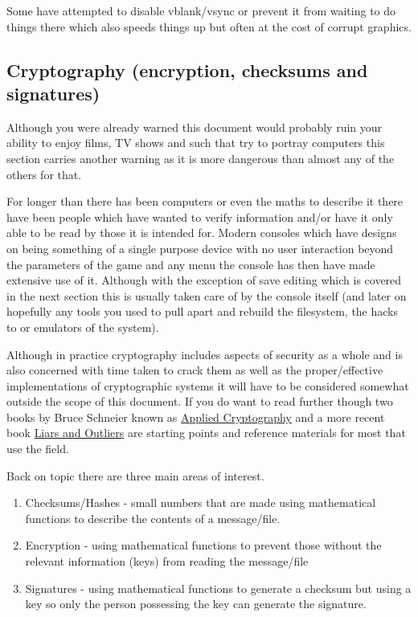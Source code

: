 \documentclass[
]{book}
\providecommand{\tightlist}{%
  \setlength{\itemsep}{0pt}\setlength{\parskip}{0pt}}
\begin{document}
Some have attempted to disable vblank/vsync or prevent it from waiting to do things there which also speeds things up but often at the cost of corrupt graphics.

\hypertarget{cryptography-encryption-checksums-and-signatures}{%
\subsection{Cryptography (encryption, checksums and signatures)}\label{cryptography-encryption-checksums-and-signatures}}

Although you were already warned this document would probably ruin your ability to enjoy films, TV shows and such that try to portray computers this section carries another warning as it is more dangerous than almost any of the others for that.

For longer than there has been computers or even the maths to describe it there have been people which have wanted to verify information and/or have it only able to be read by those it is intended for. Modern consoles which have designs on being something of a single purpose device with no user interaction beyond the parameters of the game and any menu the console has then have made extensive use of it. Although with the exception of save editing which is covered in the next section this is usually taken care of by the console itself (and later on hopefully any tools you used to pull apart and rebuild the filesystem, the hacks to or emulators of the system).

Although in practice cryptography includes aspects of security as a whole and is also concerned with time taken to crack them as well as the proper/effective implementations of cryptographic systems it will have to be considered somewhat outside the scope of this document. If you do want to read further though two books by Bruce Schneier known as \href{http://www.schneier.com/book-applied.html}{Applied Cryptography} and a more recent book \href{http://www.schneier.com/book-lo.html}{Liars and Outliers} are starting points and reference materials for most that use the field.

Back on topic there are three main areas of interest.

\begin{enumerate}
\def\labelenumi{\arabic{enumi}.}
\tightlist
\item
  Checksums/Hashes - small numbers that are made using mathematical functions to describe the contents of a message/file.
\item
  Encryption - using mathematical functions to prevent those without the relevant information (keys) from reading the message/file
\item
  Signatures - using mathematical functions to generate a checksum but using a key so only the person possessing the key can generate the signature.
\end{enumerate}
\end{document}
